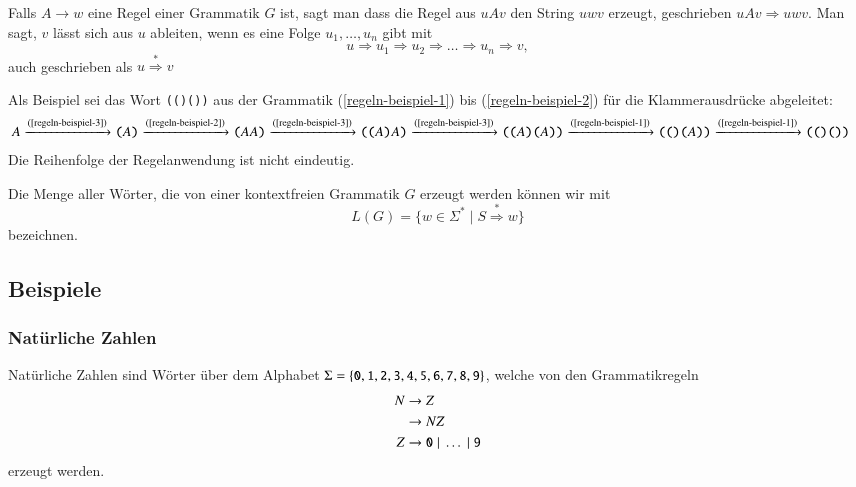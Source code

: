 \begin{definition}
%
%
Falls $A\to w$ eine Regel einer Grammatik $G$ ist, sagt man
dass die Regel aus $uAv$ den String $uwv$ erzeugt,
geschrieben $uAv\Rightarrow uwv$. Man sagt, $v$ lässt sich aus
$u$ ableiten, wenn es eine Folge $u_1,\dots,u_n$ gibt mit
\[
u\Rightarrow u_1\Rightarrow u_2\Rightarrow\dots\Rightarrow u_n\Rightarrow v,
\]
auch geschrieben als $u\overset{*}{\Rightarrow} v$
\end{definition}

\begin{beispiel}
Als Beispiel sei das Wort \texttt{(()())} aus der Grammatik
(\ref{regeln-beispiel-1})
bis
(\ref{regeln-beispiel-2})
für die Klammerausdrücke abgeleitet:
\begin{align*}
A
&\xrightarrow{\text{(\ref{regeln-beispiel-3})}} \texttt{(} A \texttt{)}
 \xrightarrow{\text{(\ref{regeln-beispiel-2})}} \texttt{(} AA \texttt{)}
 \xrightarrow{\text{(\ref{regeln-beispiel-3})}} \texttt{((} A\texttt{)}A \texttt{)}
 \xrightarrow{\text{(\ref{regeln-beispiel-3})}} \texttt{((} A\texttt{)(}A \texttt{))}
 \xrightarrow{\text{(\ref{regeln-beispiel-1})}} \texttt{((} \texttt{)(}A \texttt{))}
 \xrightarrow{\text{(\ref{regeln-beispiel-1})}} \texttt{((} \texttt{)(} \texttt{))}
\end{align*}
Die Reihenfolge der Regelanwendung ist nicht eindeutig.
\end{beispiel}

\begin{definition}
%
Die Menge aller Wörter, die von einer kontextfreien Grammatik 
$G$ erzeugt werden können wir mit
\[
L(G)=\{w\in\Sigma^*\;|\; S\overset{*}{\Rightarrow} w\}
\]
bezeichnen.
\end{definition}

\subsection{Beispiele}
\subsubsection{Natürliche Zahlen}
Natürliche Zahlen sind Wörter über dem Alphabet $\Sigma=\{
{\tt 0},
{\tt 1},
{\tt 2},
{\tt 3},
{\tt 4},
{\tt 5},
{\tt 6},
{\tt 7},
{\tt 8},
{\tt 9}\}$, welche von den Grammatikregeln
\begin{align*}
N&\to Z\\
 &\to NZ\\
Z&\to {\tt 0}\;|\;\dots \;|\;{\tt 9}
\end{align*}
erzeugt werden.

